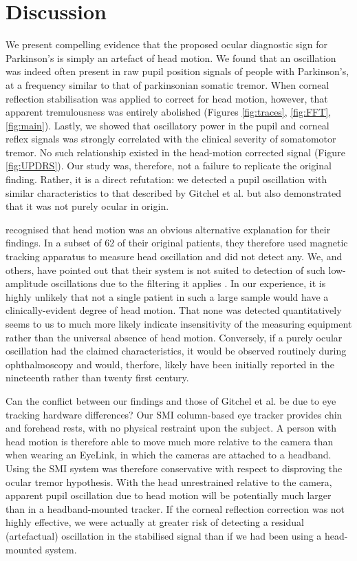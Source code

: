 \documentclass[jou,a4paper]{apa6}
\begin{document}
\section{Discussion}
We present compelling evidence that the proposed ocular diagnostic sign for Parkinson's \citep{Gitchel2012Pervasive-ocula} is simply an artefact of head motion. We found that an oscillation was indeed often present in raw pupil position signals of people with Parkinson's, at a frequency similar to that of parkinsonian somatic tremor. When corneal reflection stabilisation was applied to correct for head motion, however, that apparent tremulousness was entirely abolished (Figures \ref{fig:traces}, \ref{fig:FFT}, \ref{fig:main}). Lastly, we showed that oscillatory power in the pupil and corneal reflex signals was strongly correlated with the clinical severity of somatomotor tremor. No such relationship existed in the head-motion corrected signal (Figure \ref{fig:UPDRS}). Our study was, therefore, not a failure to replicate the original finding. Rather, it is a direct refutation: we detected a pupil oscillation with similar characteristics to that described by Gitchel et al. but also demonstrated that it was not purely ocular in origin.

\citet{Gitchel2012Pervasive-ocula} recognised that head motion was an obvious alternative explanation for their findings. In a subset of 62 of their original patients, they therefore used magnetic tracking apparatus to measure head oscillation and did not detect any. We, and others, have pointed out that their system is not suited to detection of such low-amplitude oscillations due to the filtering it applies \citep{MacAskill2013Ocular-Tremor-i,Saifee2014Tremor-of-the-e}. In our experience, it is highly unlikely that not a single patient in such a large sample would have a clinically-evident degree of head motion. That none was detected quantitatively seems to us to much more likely indicate insensitivity of the measuring equipment rather than the universal absence of head motion. Conversely, if a purely ocular oscillation had the claimed characteristics, it would be observed routinely during ophthalmoscopy \citep{Leigh2013Tremor-of-the-e,Saifee2014Tremor-of-the-e} and would, therfore, likely have been initially reported in the nineteenth rather than twenty first century.

Can the conflict between our findings and those of Gitchel et al. be due to eye tracking hardware differences? Our SMI column-based eye tracker provides chin and forehead rests, with no physical restraint upon the subject. A person with head motion is therefore able to move much more relative to the camera than when wearing an EyeLink, in which the cameras are attached to a headband. Using the SMI system was therefore conservative with respect to disproving the ocular tremor hypothesis. With the head unrestrained relative to the camera, apparent pupil oscillation due to head motion will be potentially much larger than in a headband-mounted tracker. If the corneal reflection correction was not highly effective, we were actually at greater risk of detecting a residual (artefactual) oscillation in the stabilised signal than if we had been using a head-mounted system. 
\end{document}
